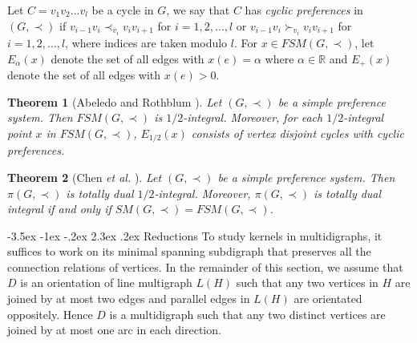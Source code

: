\documentclass[11pt]{article}
\makeatletter
\newtheorem{theorem}{Theorem}%
\numberwithin{theorem}{section}
\renewcommand\section{%
  \@startsection{section}{1}
                {\z@}%
                {-3.5ex \@plus -1ex \@minus -.2ex}%
                {2.3ex \@plus.2ex}%
                {\large\bfseries}%
}
\makeatother
\begin{document}
Let $C=v_1 v_2 \ldots v_l$ be a cycle in $G$, we say that $C$ has \textit{cyclic preferences} in $(G,\prec)$ if
$v_{i-1} v_i \prec_{v_i} v_i v_{i+1}$ for $i=1,2,\ldots,l$
or $v_{i-1} v_i\succ_{v_i} v_i v_{i+1}$ for $i=1,2,\ldots,l$,
where indices are taken modulo $l$.
For $x\in FSM(G,\prec)$, let $E_{\alpha}(x)$ denote the set of all edges with $x(e)=\alpha$ where $\alpha\in\mathbb{R}$ and $E_+(x)$ denote the set of all edges with $x(e)>0$.

\begin{theorem}[Abeledo and Rothblum \cite{AbelRoth94}]
\label{thm:AbelRoth94}
Let $(G,\prec)$ be a simple preference system. Then $FSM(G,\prec)$ is $1/2$-integral. Moreover, for each $1/2$-integral point $x$ in $FSM(G,\prec)$, $E_{1/2}(x)$ consists of vertex disjoint cycles with cyclic preferences.
\end{theorem} 

\begin{theorem}[Chen \textit{et al.} \cite{ChenDing12}]
\label{thm:ChenDing12}
Let $(G,\prec)$ be a simple preference system. Then $\pi(G,\prec)$ is totally dual $1/2$-integral. Moreover, $\pi(G,\prec)$ is totally dual integral if and only if $SM(G,\prec)=FSM(G,\prec)$.
\end{theorem}

\section{Reductions}
To study kernels in multidigraphs, it suffices to work on its minimal spanning subdigraph that  preserves all the connection relations of vertices. In the remainder of this section, we assume that $D$ is an orientation of line multigraph $L(H)$ such that any two vertices in $H$ are joined by at most two edges and parallel edges in $L(H)$ are orientated oppositely. Hence $D$ is a multidigraph such that any two distinct vertices are joined by at most one arc in each direction.
\end{document}
